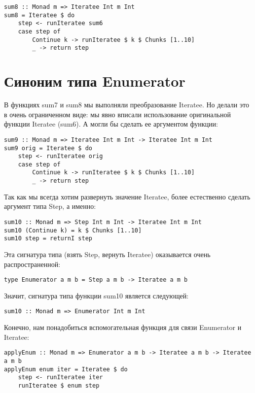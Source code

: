 \begin{lstlisting}
sum8 :: Monad m => Iteratee Int m Int
sum8 = Iteratee $ do
    step <- runIteratee sum6
    case step of
        Continue k -> runIteratee $ k $ Chunks [1..10]
        _ -> return step
\end{lstlisting}%

\section{Синоним типа Enumerator}

В функциях sum7 и sum8 мы выполняли преобразование Iteratee. Но делали это в очень ограниченном виде: мы явно вписали использование оригинальной функции Iteratee (sum6). А могли бы сделать ее аргументом функции:

\begin{lstlisting}
sum9 :: Monad m => Iteratee Int m Int -> Iteratee Int m Int
sum9 orig = Iteratee $ do
    step <- runIteratee orig
    case step of
        Continue k -> runIteratee $ k $ Chunks [1..10]
        _ -> return step
\end{lstlisting}%

Так как мы всегда хотим развернуть значение Iteratee, более естественно сделать аргумент типа Step, а именно:

\begin{lstlisting}
sum10 :: Monad m => Step Int m Int -> Iteratee Int m Int
sum10 (Continue k) = k $ Chunks [1..10]
sum10 step = returnI step
\end{lstlisting}%

Эта сигнатура типа (взять Step, вернуть Iteratee) оказывается очень распространенной:

\begin{lstlisting}
type Enumerator a m b = Step a m b -> Iteratee a m b
\end{lstlisting}

Значит, сигнатура типа функции sum10 является следующей:

\begin{lstlisting}
sum10 :: Monad m => Enumerator Int m Int
\end{lstlisting}

Конечно, нам понадобиться вспомогательная функция для связи Enumerator и Iteratee:

\begin{lstlisting}
applyEnum :: Monad m => Enumerator a m b -> Iteratee a m b -> Iteratee a m b
applyEnum enum iter = Iteratee $ do
    step <- runIteratee iter
    runIteratee $ enum step
\end{lstlisting}%

